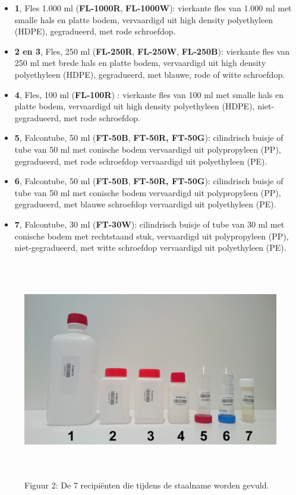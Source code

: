 \documentclass[
]{scrreprt}
\begin{document}
\begin{itemize}
\item
  \textbf{1}, Fles 1.000 ml (\textbf{FL-1000R}, \textbf{FL-1000W}): vierkante fles van 1.000 ml met smalle hals en platte bodem, vervaardigd uit high density polyethyleen (HDPE), gegradueerd, met rode schroefdop.
\item
  \textbf{2 en 3}, Fles, 250 ml (\textbf{FL-250R}, \textbf{FL-250W}, \textbf{FL-250B}): vierkante fles van 250 ml met brede hals en platte bodem, vervaardigd uit high density polyethyleen (HDPE), gegradueerd, met blauwe, rode of witte schroefdop.
\item
  \textbf{4}, Fles, 100 ml (\textbf{FL-100R}) : vierkante fles van 100 ml met smalle hals en platte bodem, vervaardigd uit high density polyethyleen (HDPE), niet-gegradueerd, met rode schroefdop.
\item
  \textbf{5}, Falcontube, 50 ml (\textbf{FT-50B}, \textbf{FT-50R, FT-50G}): cilindrisch buisje of tube van 50 ml met conische bodem vervaardigd uit polypropyleen (PP), gegradueerd, met rode schroefdop vervaardigd uit polyethyleen (PE).
\item
  \textbf{6}, Falcontube, 50 ml (\textbf{FT-50B}, \textbf{FT-50R, FT-50G}): cilindrisch buisje of tube van 50 ml met conische bodem vervaardigd uit polypropyleen (PP), gegradueerd, met blauwe schroefdop vervaardigd uit polyethyleen (PE).
\item
  \textbf{7}, Falcontube, 30 ml (\textbf{FT-30W}): cilindrisch buisje of tube van 30 ml met conische bodem met rechtstaand stuk, vervaardigd uit polypropyleen (PP), niet-gegradueerd, met witte schroefdop vervaardigd uit polyethyleen (PE).
\end{itemize}

\begin{figure}
\centering
\includegraphics[width=6.29966in,height=3.76389in]{./media/image2.jpg}
\caption{Figuur 2: De 7 recipiënten die tijdens de staalname worden gevuld.}
\end{figure}
\end{document}
